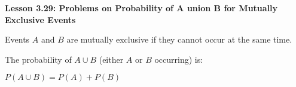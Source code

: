 \begin{center}
\textbf{Lesson 3.29: Problems on Probability of A union B for Mutually Exclusive Events}
\end{center}

\vspace*{-1.5ex}

\noindent Events \( A \) and \( B \) are mutually exclusive if they cannot occur at the same time.%

\noindent The probability of \( A \cup B \) (either \( A \) or \( B \) occurring) is:

{\centering $ P(A \cup B) = P(A) + P(B) $\par}
